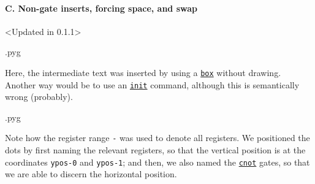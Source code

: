 \documentclass{scrartcl}
\makeatletter
\newenvironment{codeexample}{%
   \VerbatimEnvironment%
   \let\FVB@VerbatimOut\minted@FVB@VerbatimOut
   \let\FVE@VerbatimOut\minted@FVE@VerbatimOut
   \minted@configlang{tex}%
   \minted@fvset
   \begin{VerbatimOut}[codes={\catcode`\^^I=12},firstline,lastline]{\minted@jobname.pyg}%
}{
   \end{VerbatimOut}%
   \minted@langlinenoson%
   \savebox\codeexamplebox{ \minted@jobname.pyg}%
   \ifdim\wd\codeexamplebox>\dimexpr.5\linewidth-3mm\relax%
      \wd\codeexamplebox=.5\linewidth%
   \else%
      \wd\codeexamplebox=\dimexpr\wd\codeexamplebox+3mm\relax%
   \fi%
   \noindent\begin{minipage}{\wd\codeexamplebox}%
      \centering%
      \usebox\codeexamplebox%
   \end{minipage}%
   \begin{minipage}{\dimexpr\linewidth-\wd\codeexamplebox\relax}%
      \minted@pygmentize{\minted@lang}%
   \end{minipage}%
   \minted@langlinenosoff%
   \par%
}
\def\gate#1{\hyperref[gate:#1]{\texttt{#1}}}
\makeatother
\begin{document}
            \paragraph{C. Non-gate inserts, forcing space, and swap}\leavevmode
               \begin{example}<Updated in 0.1.1>
                  \begin{codeexample}
                  \end{codeexample}
                  Here, the intermediate text was inserted by using a \gate{box} without drawing.
                  Another way would be to use an \gate{init} command, although this is semantically wrong (probably).
               \end{example}

               \begin{example}
                  \begin{codeexample}
                  \end{codeexample}
                  Note how the register range \texttt{-} was used to denote all registers.
                  We positioned the dots by first naming the relevant registers, so that the vertical position is at the coordinates \texttt{ypos-0} and \texttt{ypos-1}; and then, we also named the \gate{cnot} gates, so that we are able to discern the horizontal position.
               \end{example}

            \clearpage
\end{document}

